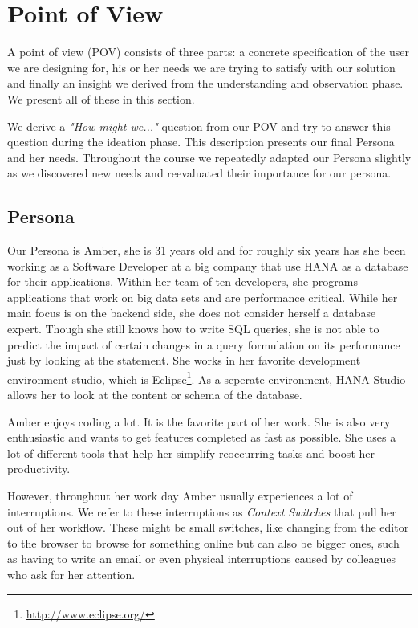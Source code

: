 
\section{Point of View} \label{sec:POINT_OF_VIEW}

A point of view (POV) consists of three parts: a concrete specification of the user we are designing for, his or her needs we are trying to satisfy with our solution and finally an insight we derived from the understanding and observation phase. We present all of these in this section.

We derive a \emph{"How might we..."}-question from our POV and try to answer this question during the ideation phase. This description presents our final Persona and her needs. Throughout the course we repeatedly adapted our Persona slightly as we discovered new needs and reevaluated their importance for our persona.

\subsection{Persona}
\label{subsec:persona}

Our Persona is Amber, she is 31 years old and for roughly six years has she been working as a Software Developer at a big company that use HANA as a database for their applications. Within her team of ten developers, she programs applications that work on big data sets and are performance critical. While her main focus is on the backend side, she does not consider herself a database expert. Though she still knows how to write SQL queries, she is not able to predict the impact of certain changes in a query formulation on its performance just by looking at the statement. She works in her favorite development environment studio, which is Eclipse\footnote{\url{http://www.eclipse.org/}}. As a seperate environment, HANA Studio allows her to look at the content or schema of the database.

Amber enjoys coding a lot. It is the favorite part of her work. She is also very enthusiastic and wants to get features completed as fast as possible. She uses a lot of different tools that help her simplify reoccurring tasks and boost her productivity.

However, throughout her work day Amber usually experiences a lot of interruptions. We refer to these interruptions as \emph{Context Switches} that pull her out of her workflow. These might be small switches, like changing from the editor to the browser to browse for something online but can also be bigger ones, such as having to write an email or even physical interruptions caused by colleagues who ask for her attention.

